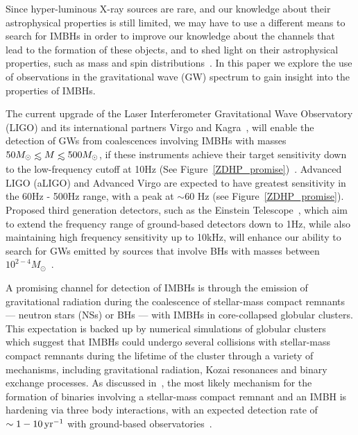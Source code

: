 \documentclass[aps,prd,showpacs,amssymb,floatfix,nofootinbib,superscriptaddress]{revtex4-1}%
\def\lesssim{\mathrel{\hbox{\rlap{\hbox{\lower4pt\hbox{$\sim$}}}\hbox{$<$}}}}
\begin{document}
Since hyper-luminous X-ray sources are rare, and our knowledge about their astrophysical properties is still limited, we may have to use a different means to search for IMBHs in order to improve our knowledge about the channels that lead to the formation of these objects, and to shed light on their astrophysical properties, such as mass and spin distributions~\cite{mandel}. In this paper we explore the use of observations in the gravitational wave (GW) spectrum to gain insight into the properties of IMBHs. 

The current upgrade of the Laser Interferometer Gravitational Wave Observatory (LIGO) and its international partners Virgo and Kagra~\cite{aLIGo, virgo,kagra}, will enable the detection of GWs from coalescences involving IMBHs with masses \(50 M_{\odot} \lesssim M \lesssim 500 M_{\odot}\), if these instruments achieve their target sensitivity down to the low-frequency cutoff at 10Hz (See Figure~\ref{ZDHP_promise})~\cite{ZDHP:2010}.  Advanced LIGO (aLIGO) and Advanced Virgo are expected to have greatest sensitivity in the 60Hz - 500Hz range, with a peak at \(\sim60\) Hz (see Figure~\ref{ZDHP_promise}). Proposed third generation detectors, such as the Einstein Telescope~\cite{Freise:2009}, which aim to extend the frequency range of ground-based detectors down to 1Hz, while also maintaining high frequency sensitivity up to 10kHz, will enhance our ability to search for GWs emitted by sources that involve BHs with masses between \(10^{2-4}M_{\odot}\)~\cite{etgair,Huerta:2011a,Huerta:2011b}. 


A promising channel for detection of IMBHs is through the emission of gravitational radiation during the coalescence of stellar-mass compact remnants --- neutron stars (NSs) or BHs --- with IMBHs in core-collapsed globular clusters. This expectation is backed up by numerical simulations of globular clusters~\cite{Taniguchi:2000,Miller:2002,Mouri:2002a,Mouri:2002b,Gultekin:2004,Gultekin:2006,Oleary:2006,Oleary:2007}  which suggest that IMBHs could undergo several collisions with stellar-mass compact remnants during the lifetime of the cluster through a variety of mechanisms, including gravitational radiation, Kozai resonances and binary exchange processes.  As discussed in~\cite{man}, the most likely mechanism for the formation of binaries involving a stellar-mass compact remnant and an IMBH is hardening via three body interactions, with an expected detection rate of \(\sim 1-10\, {\rm{yr}}^{-1}\) with ground-based observatories~\cite{man,Abadie:2010}. 
\end{document}

